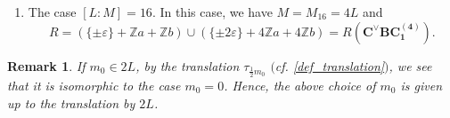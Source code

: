 \documentclass[11pt]{amsart}
\newcommand{\Z}{\mathbb{Z}}
\newtheorem{rem}[thm]{Remark}%
\newcommand{\vep}{\varepsilon}
\begin{document}
\begin{enumerate}
\begin{enumerate}
\begin{enumerate}
\item[(i)] For $m_0=0$, 
\[ R=(\{ \pm\vep \}+\Z a+\Z b) \cup (\{ \pm 2\vep \}+2\Z a+4\Z b) =R(\mathbf{C^\vee BC_1^{(2)}(2)}).
\]
\item[(ii)] For $m_0=a$,  
\[ R=(\{ \pm\vep \}+\Z a+\Z b) \cup (\{ \pm 2\vep \}+(1+2\Z) a+4\Z b) =R(\mathbf{BC_1^{(4,2)}}). 
\]
\end{enumerate}
\end{enumerate}
\item The case $[L:M]=16$. In this case, we have $M=M_{16}=4L$ and 
\[ R=(\{ \pm\vep \}+\Z a+\Z b) \cup (\{ \pm 2\vep \}+4\Z a+4\Z b) =R(\mathbf{C^\vee BC_1^{(4)}}).
\]
\end{enumerate}

\begin{rem}\label{rem_m_0} If $m_0 \in 2L$, by the translation $\tau_{\frac{1}{2}m_0}$ $($cf. \eqref{def_translation}$)$, we see that it is isomorphic to the case $m_0=0$. Hence, the above choice of $m_0$ is given up  to the translation by $2L$. 
\end{rem}
\end{document}
